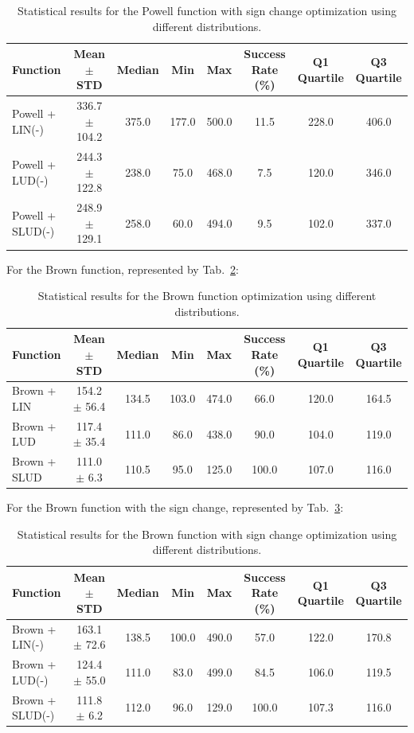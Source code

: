 \documentclass[10pt,fleqn,a4paper,twoside]{article}
\begin{document}
\begin{table}[H]
\centering
\caption{Statistical results for the Powell function with sign change optimization using different distributions.}
\label{Tab:2b}
\begin{tabular}{l|c|c|c|c|c|c|c}
\hline
\textbf{Function} & \textbf{Mean $\pm$ STD} & \textbf{Median} & \textbf{Min} & \textbf{Max} & \textbf{Success Rate (\%)} & \textbf{Q1 Quartile} & \textbf{Q3 Quartile}\\
\hline
Powell + LIN(-)         & 336.7 $\pm$ 104.2     & 375.0 & 177.0 & 500.0 & 11.5 & 228.0 & 406.0\\
Powell + LUD(-)         & 244.3 $\pm$ 122.8     & 238.0 & 75.0 & 468.0 & 7.5 & 120.0 & 346.0\\
Powell + SLUD(-)        & 248.9 $\pm$ 129.1     & 258.0 & 60.0 & 494.0 & 9.5 & 102.0 & 337.0\\
\hline
\end{tabular}
\end{table}

For the Brown function, represented by Tab.~\ref{Tab:3}:

\begin{table}[H]
\centering
\caption{Statistical results for the Brown function optimization using different distributions.}
\label{Tab:3}
\begin{tabular}{l|c|c|c|c|c|c|c}
\hline
\textbf{Function} & \textbf{Mean $\pm$ STD} & \textbf{Median} & \textbf{Min} & \textbf{Max} & \textbf{Success Rate (\%)} & \textbf{Q1 Quartile} & \textbf{Q3 Quartile}\\
\hline
Brown + LIN          & 154.2 $\pm$ 56.4      & 134.5 & 103.0 & 474.0 & 66.0 & 120.0 & 164.5\\
Brown + LUD          & 117.4 $\pm$ 35.4      & 111.0 & 86.0 & 438.0 & 90.0 & 104.0 & 119.0\\
Brown + SLUD         & 111.0 $\pm$ 6.3       & 110.5 & 95.0 & 125.0 & 100.0 & 107.0 & 116.0\\
\hline
\end{tabular}
\end{table}

For the Brown function with the sign change, represented by Tab.~\ref{Tab:3b}:

\begin{table}[H]
\centering
\caption{Statistical results for the Brown function with sign change optimization using different distributions.}
\label{Tab:3b}
\begin{tabular}{l|c|c|c|c|c|c|c}
\hline
\textbf{Function} & \textbf{Mean $\pm$ STD} & \textbf{Median} & \textbf{Min} & \textbf{Max} & \textbf{Success Rate (\%)} & \textbf{Q1 Quartile} & \textbf{Q3 Quartile}\\
\hline
Brown + LIN(-)          & 163.1 $\pm$ 72.6      & 138.5 & 100.0 & 490.0 & 57.0 & 122.0 & 170.8\\
Brown + LUD(-)          & 124.4 $\pm$ 55.0      & 111.0 & 83.0 & 499.0 & 84.5 & 106.0 & 119.5\\
Brown + SLUD(-)         & 111.8 $\pm$ 6.2       & 112.0 & 96.0 & 129.0 & 100.0 & 107.3 & 116.0\\
\hline
\end{tabular}
\end{table}
\end{document}
